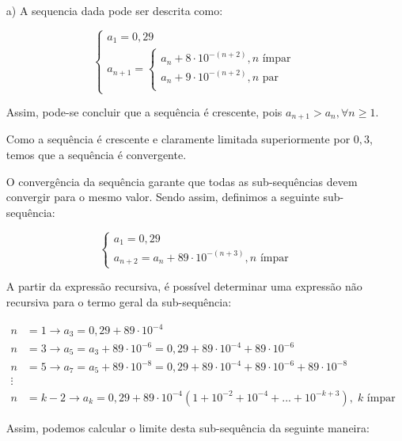 \documentclass[12pt,a4paper]{article}
\begin{document}
\begin{itemize}
    \item[a)] A sequencia dada pode ser descrita como:
    
    $$
    \begin{cases}
    a_1 = 0,29 \\
    a_{n+1} =
        \begin{cases}
        a_n + 8 \cdot 10^{-(n+2)}, \text{$n$ ímpar} \\
        a_n + 9 \cdot 10^{-(n+2)}, \text{$n$ par} \\
        \end{cases}  
    \end{cases}
    $$
    
    Assim, pode-se concluir que a sequência é crescente, pois $a_{n+1} > a_n, \forall n \geq 1$. 
    
    Como a sequência é crescente e claramente limitada superiormente por $0,3$, temos que a sequência é convergente.
    
    O convergência da sequência garante que todas as sub-sequências devem convergir para o mesmo valor. Sendo assim, definimos a seguinte sub-sequência:
    
    $$
    \begin{cases}
    a_1 = 0,29 \\
    a_{n+2} =  a_n + 89 \cdot 10^{-(n+3)}, \text{$n$ ímpar}
    \end{cases}
    $$
    
    A partir da expressão recursiva, é possível determinar uma expressão não recursiva para o termo geral da sub-sequência:
    
    \begin{align*} 
    n &= 1 \rightarrow a_3 = 0,29 + 89 \cdot 10^{-4} \\ 
    n &= 3 \rightarrow a_5 = a_3 + 89 \cdot 10^{-6} = 0,29 + 89 \cdot 10^{-4} + 89 \cdot 10^{-6} \\
    n &= 5 \rightarrow a_7 = a_5 + 89 \cdot 10^{-8} = 0,29 + 89 \cdot 10^{-4} + 89 \cdot 10^{-6} + 89 \cdot 10^{-8}\\
    \vdots \\
    n &= k-2 \rightarrow a_k = 0,29 + 89 \cdot 10^{-4}(1 + 10^{-2} + 10^{-4} + ... + 10^{-k+3}), \; \text{$k$ ímpar}
    \end{align*}
    
    Assim, podemos calcular o limite desta sub-sequência da seguinte maneira:
    

\end{itemize}
\end{document}
